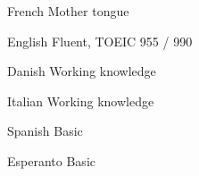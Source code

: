 


\begin{cvhonors}

  \cvhonor
    {French} %
    {Mother tongue} %
    {\emojiflagfr} %
    {} %

  \cvhonor
    {English} %
    {Fluent, TOEIC 955 / 990} %
    {\emojiflagus} %
    {} %

  \cvhonor
    {Danish} %
    {Working knowledge} %
    {\emojiflagdk} %
    {} %

  \cvhonor
    {Italian} %
    {Working knowledge} %
    {\emojiflagit} %
    {} %

  \cvhonor
    {Spanish} %
    {Basic} %
    {\emojiflages} %
    {} %

  \cvhonor
    {Esperanto} %
    {Basic} %
    {} %
    {} %

\end{cvhonors}
